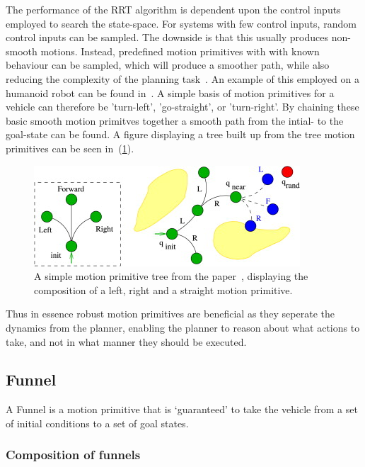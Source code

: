 The performance of the \ac{RRT} algorithm is dependent upon the control inputs
employed to search the state-space. For systems with few control inputs, random
control inputs can be sampled. The downside is that this usually produces
non-smooth motions. Instead, predefined motion primitives with with known
behaviour can be sampled, which will produce a smoother path, while also
reducing the complexity of the planning
task~\cite{vonasekGlobalMotionPlanning2013}. An example of this employed on a
humanoid robot can be found in~\cite{hauserUsingMotionPrimitives2008}. A simple
basis of motion primitives for a vehicle can therefore be 'turn-left',
'go-straight', or 'turn-right'. By chaining these basic smooth motion primitves
together a smooth path from the intial- to the goal-state can be found. A figure
displaying a tree built up from the tree motion primitives can be seen
in~(\ref{fig:motion-primitive-tree}).

\begin{figure}
  \centering
  \includegraphics[scale=.5]{figures/preliminaries/motion-primitive-tree}
  \caption{A simple motion primitive tree from the
    paper~\cite{vonasekHighlevelMotionPlanning2015}, displaying the composition
    of a left, right and a straight motion primitive.}
  \label{fig:motion-primitive-tree}
\end{figure}

Thus in essence robust motion primitives are beneficial as they seperate the
dynamics from the planner, enabling the planner to reason about what actions to
take, and not in what manner they should be executed.

\subsection{Funnel}

A Funnel is a motion primitive that is `guaranteed' to take the vehicle from a
set of initial conditions to a set of goal states.

\subsubsection{Composition of funnels}


